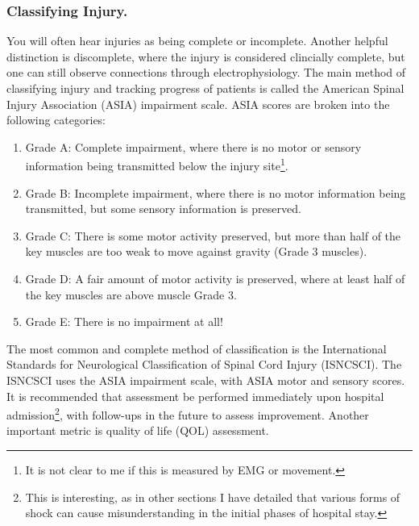 \documentclass[12pt]{report}
\begin{document}
\subsubsection{Classifying Injury.}
You will often hear injuries as being complete or incomplete. Another helpful distinction is discomplete, where the injury is considered clincially complete, but one can still observe connections through electrophysiology. The main method of classifying injury and tracking progress of patients is called the American Spinal Injury Association (ASIA) impairment scale. ASIA scores are broken into the following categories: 

\begin{enumerate}
    \item Grade A: Complete impairment, where there is no motor or sensory information being transmitted below the injury site\footnote{It is not clear to me if this is measured by EMG or movement.}.
    \item Grade B: Incomplete impairment, where there is no motor information being transmitted, but some sensory information is preserved. 
    \item Grade C: There is some motor activity preserved, but more than half of the key muscles are too weak to move against gravity (Grade 3 muscles). 
    \item Grade D: A fair amount of motor activity is preserved, where at least half of the key muscles are above muscle Grade 3.
    \item Grade E: There is no impairment at all!
\end{enumerate}

The most common and complete method of classification is the International Standards for Neurological Classification of Spinal Cord Injury (ISNCSCI). The ISNCSCI uses the ASIA impairment scale, with ASIA motor and sensory scores. It is recommended that assessment be performed immediately upon hospital admission\footnote{This is interesting, as in other sections I have detailed that various forms of shock can cause misunderstanding in the initial phases of hospital stay.}, with follow-ups in the future to assess improvement. Another important metric is quality of life (QOL) assessment.\newline 
\end{document}
